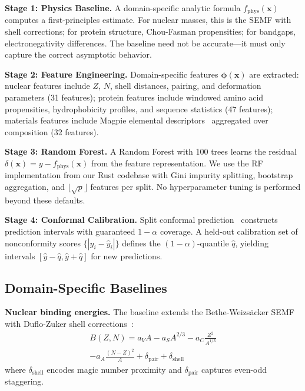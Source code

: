 \documentclass[twocolumn,letterpaper,10pt]{article}
\begin{document}
\textbf{Stage 1: Physics Baseline.} A domain-specific analytic formula
$f_{\text{phys}}(\mathbf{x})$ computes a first-principles estimate. For nuclear
masses, this is the SEMF with shell corrections; for protein structure,
Chou-Fasman propensities; for bandgaps, electronegativity differences. The
baseline need not be accurate---it must only capture the correct asymptotic
behavior.

\textbf{Stage 2: Feature Engineering.} Domain-specific features
$\boldsymbol{\phi}(\mathbf{x})$ are extracted: nuclear features include
$Z$, $N$, shell distances, pairing, and deformation parameters (31 features);
protein features include windowed amino acid propensities, hydrophobicity
profiles, and sequence statistics (47 features); materials features include
Magpie elemental descriptors~\citep{ward2016} aggregated over composition
(32 features).

\textbf{Stage 3: Random Forest.} A Random Forest with 100 trees learns the
residual $\delta(\mathbf{x}) = y - f_{\text{phys}}(\mathbf{x})$ from the
feature representation. We use the RF implementation from our Rust codebase
with Gini impurity splitting, bootstrap aggregation, and $\lfloor\sqrt{p}\rfloor$
features per split. No hyperparameter tuning is performed beyond these defaults.

\textbf{Stage 4: Conformal Calibration.} Split conformal
prediction~\citep{vovk2005} constructs prediction intervals with guaranteed
$1-\alpha$ coverage. A held-out calibration set of nonconformity scores
$\{|y_i - \hat{y}_i|\}$ defines the $(1-\alpha)$-quantile $\hat{q}$, yielding
intervals $[\hat{y} - \hat{q}, \hat{y} + \hat{q}]$ for new predictions.

\subsection{Domain-Specific Baselines}

\textbf{Nuclear binding energies.} The baseline extends the
Bethe-Weizs\"{a}cker SEMF~\citep{ame2020} with Duflo-Zuker shell
corrections~\citep{duflo1995}:
\begin{multline}
  B(Z,N) = a_V A - a_S A^{2/3} - a_C \frac{Z^2}{A^{1/3}} \\
  - a_A \frac{(N-Z)^2}{A} + \delta_{\text{pair}} + \delta_{\text{shell}}
  \label{eq:semf}
\end{multline}
where $\delta_{\text{shell}}$ encodes magic number proximity and
$\delta_{\text{pair}}$ captures even-odd staggering.
\end{document}
